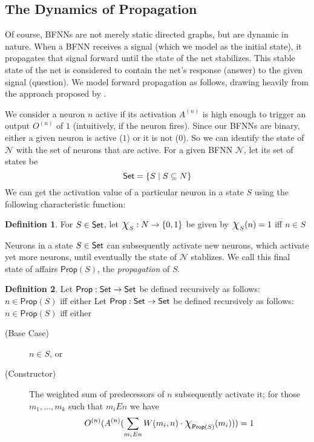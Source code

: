 \documentclass[letterpaper]{article}
\theoremstyle{definition}
\newtheorem{definition}{Definition}
\newcommand{\Set}{\mbox{\sf Set}}
\newcommand{\set}[1]{\{ #1 \}}
\newcommand*{\bigchi}{\mbox{\Large$\chi$}}%
\newcommand{\Prop}{\textsf{Prop}}
\newcommand{\Net}{\mathcal{N}}
\begin{document}
\subsection{The Dynamics of Propagation}

Of course, BFNNs are not merely static directed graphs, but are dynamic in nature.  When a BFNN receives a signal (which we model as the initial state), it propagates that signal forward until the state of the net stabilizes.  This stable state of the net is considered to contain the net's response (answer) to the given signal (question).  We model forward propagation as follows, drawing heavily from the approach proposed by \citep{leitgeb2001nonmonotonic}.

We consider a neuron $n$ active if its activation $A^{(n)}$ is high enough to trigger an output $O^{(n)}$ of $1$ (intuitively, if the neuron fires).  Since our BFNNs are binary, either a given neuron is active ($1$) or it is not ($0$).  So we can identify the state of $\Net$ with the set of neurons that are active.  For a given BFNN $\Net$, let its set of states be
\[
    \Set = \set{S \mid S \subseteq N}
\]
We can get the activation value of a particular neuron in a state $S$ using the following characteristic function:
\begin{definition}
    For $S \in \Set$, let 
    $\bigchi_S : N \to \set{0, 1}$ be given by $\bigchi_S(n) = 1$ iff $n \in S$
\end{definition}

Neurons in a state $S \in \Set$ can subsequently activate new neurons, which activate yet more neurons, until eventually the state of $\Net$ stablizes.  We call this final state of affairs $\Prop(S)$, the \emph{propagation} of $S$.

\begin{definition}
\label{def:propagation}
Let $\Prop : \Set \to \Set$ be defined recursively as follows:  $n \in \Prop(S)$ iff either
Let $\Prop : \Set \to \Set$ be defined recursively as follows:  $n \in \Prop(S)$ iff either
\begin{description}
    \item[(Base Case)] $n \in S$, or
    \item[(Constructor)] The weighted sum of predecessors of $n$ subsequently activate it; for those $m_1, \ldots, m_k$ such that $m_i{E}n$ we have
    \[
    O^{(n)}(A^{(n)}(\sum_{m_i{E}n} W(m_i, n) \cdot \bigchi_{\Prop(S)}(m_i))) = 1
    \]
\end{description}
\end{definition}
\end{document}
